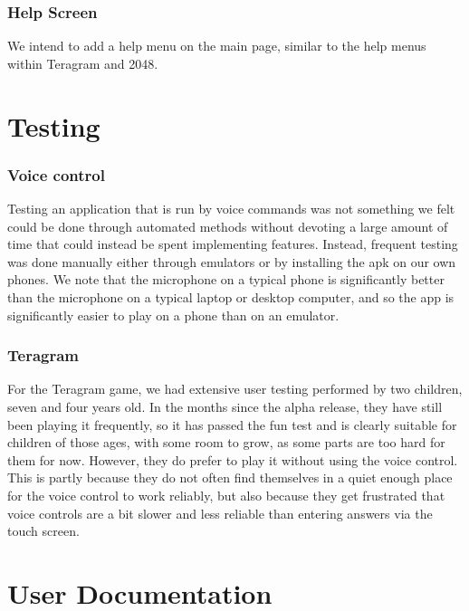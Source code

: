 \documentclass[11pt, oneside]{article}
\begin{document}
\subsubsection*{Help Screen}

We intend to add a help menu on the main page, similar to the help
menus within Teragram and 2048.


\section{Testing}

\subsubsection*{Voice control}

Testing an application that is run by voice commands was not something
we felt could be done through automated methods without devoting a
large amount of time that could instead be spent implementing
features. Instead, frequent testing was done manually either through
emulators or by installing the apk on our own phones. We note that the
microphone on a typical phone is significantly better than the
microphone on a typical laptop or desktop computer, and so the app is
significantly easier to play on a phone than on an emulator.


\subsubsection*{Teragram}

For the Teragram game, we had extensive user testing performed by two
children, seven and four years old. In the months since the alpha
release, they have still been playing it frequently, so it has passed
the fun test and is clearly suitable for children of those ages, with
some room to grow, as some parts are too hard for them for
now. However, they do prefer to play it without using the voice
control. This is partly because they do not often find themselves in a
quiet enough place for the voice control to work reliably, but also
because they get frustrated that voice controls are a bit slower and
less reliable than entering answers via the touch screen.

\pagebreak

\section{User Documentation}
\end{document}
